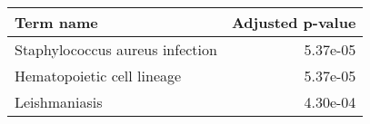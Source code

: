 \begin{tabular}{lr}
\toprule
                      Term name &  Adjusted p-value \\
\midrule
Staphylococcus aureus infection &          5.37e-05 \\
     Hematopoietic cell lineage &          5.37e-05 \\
                  Leishmaniasis &          4.30e-04 \\
\bottomrule
\end{tabular}
